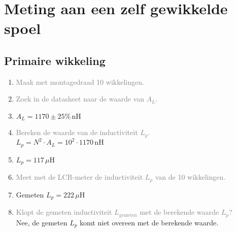 \section{Meting aan een zelf gewikkelde spoel}
\subsection{Primaire wikkeling}
\begin{enumerate}
    \item \textcolor{gray}{Maak met montagedraad 10 wikkelingen.}
    \item \textcolor{gray}{Zoek in de datasheet naar de waarde van \( A_L \).}
    \item \( A_L = 1170 \pm 25\% \, \text{nH} \)
    \item \textcolor{gray}{Bereken de waarde van de inductiviteit \( L_p \).}
    \\ \( L_p = N^2 \cdot A_L = 10^2 \cdot 1170 \, \text{nH} \)
    \item \( L_p = 117 \, \mu \text{H} \)
    \item \textcolor{gray}{Meet met de LCR-meter de inductiviteit \( L_p \) van de 10 wikkelingen.}
    \item Gemeten \( L_p = 222 \, \mu \text{H} \)
    \item \textcolor{gray}{Klopt de gemeten inductiviteit \( L_{\text{gemeten}} \) met de berekende waarde \( L_p \)?}
    \\ Nee, de gemeten \( L_p \) komt niet overeen met de berekende waarde.
\end{enumerate}
